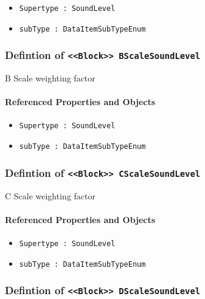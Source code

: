 \begin{itemize}
\item \texttt{Supertype : SoundLevel}

\item \texttt{subType : DataItemSubTypeEnum}

\end{itemize}
\FloatBarrier
\subsubsection{Defintion of \texttt{<<Block>> BScaleSoundLevel}}
  \label{type:BScaleSoundLevel}

\FloatBarrier

B Scale weighting factor

\FloatBarrier
\paragraph{Referenced Properties and Objects}

\begin{itemize}
\item \texttt{Supertype : SoundLevel}

\item \texttt{subType : DataItemSubTypeEnum}

\end{itemize}
\FloatBarrier
\subsubsection{Defintion of \texttt{<<Block>> CScaleSoundLevel}}
  \label{type:CScaleSoundLevel}

\FloatBarrier

C Scale weighting factor

\FloatBarrier
\paragraph{Referenced Properties and Objects}

\begin{itemize}
\item \texttt{Supertype : SoundLevel}

\item \texttt{subType : DataItemSubTypeEnum}

\end{itemize}
\FloatBarrier
\subsubsection{Defintion of \texttt{<<Block>> DScaleSoundLevel}}
  \label{type:DScaleSoundLevel}

